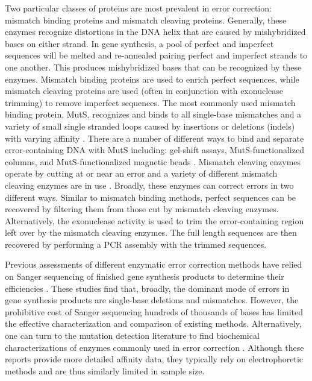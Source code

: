 \documentclass[letterpaper,12pt]{article}
\begin{document}
Two particular classes of proteins are most prevalent in error correction: mismatch binding proteins and mismatch cleaving proteins. Generally, these enzymes recognize distortions in the DNA helix that are caused by mishybridized bases on either strand. In gene synthesis, a pool of perfect and imperfect sequences will be melted and re-annealed pairing perfect and imperfect strands to one another. This produces mishybridized bases that can be recognized by these enzymes. Mismatch binding proteins are used to enrich perfect sequences, while mismatch cleaving proteins are used (often in conjunction with exonuclease trimming) to remove imperfect sequences. The most commonly used mismatch binding protein, MutS, recognizes and binds to all single-base mismatches and a variety of small single stranded loops caused by insertions or deletions (indels) with varying affinity \cite{smith1997,whitehouse1997,brown2001,cho2007,groothuizen2013}. There are a number of different ways to bind and separate error-containing DNA with MutS including: gel-shift assays, MutS-functionalized columns, and MutS-functionalized magnetic beads \cite{carr2004,wan2014,geschwind1996}. Mismatch cleaving enzymes operate by cutting at or near an error and a variety of different mismatch cleaving enzymes are in use \cite{ma2012}. Broadly, these enzymes  can correct errors in two different ways. Similar to mismatch binding methods, perfect sequences can be recovered by filtering them from those cut by mismatch cleaving enzymes. Alternatively, the exonuclease activity is used to trim the error-containing region left over by the mismatch cleaving enzymes. The full length sequences are then recovered by performing a PCR assembly with the trimmed sequences.

Previous assessments of different enzymatic error correction methods have relied on Sanger sequencing of finished gene synthesis products to determine their efficiencies \cite{carr2004,fuhrmann2005,sequeira2016,saaem2012,wan2014}. These studies find that, broadly, the dominant mode of errors in gene synthesis products are single-base deletions and mismatches. However, the prohibitive cost of Sanger sequencing hundreds of thousands of bases has limited the effective characterization and comparison of existing methods. Alternatively, one can turn to the mutation detection literature to find biochemical characterizations of enzymes commonly used in error correction \cite{qiu2004mutation,cho2007,tsuji2008,huang2012,vouillot2015}. Although these reports provide more detailed affinity data, they typically rely on electrophoretic methods and are thus similarly limited in sample size.
\end{document}
